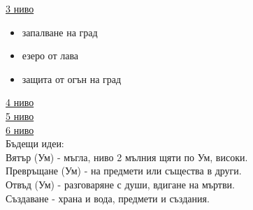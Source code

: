 \underline{3 ниво}
\begin{itemize}
  \item{запалване на град}
  \item{езеро от лава}
  \item{защита от огън на град}
\end{itemize}

\underline{4 ниво}  \\

\underline{5 ниво}  \\

\underline{6 ниво}  \\


Бъдещи идеи:  \\
Вятър (Ум) - мъгла, ниво 2 мълния щяти по Ум, високи.   \\
Превръщане (Ум) - на предмети или същества в други.     \\
Отвъд (Ум) - разговаряне с души, вдигане на мъртви.     \\
Създаване - храна и вода, предмети и създания.          \\







